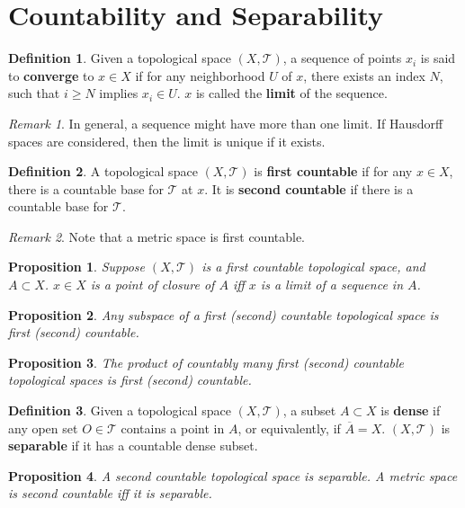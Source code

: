 \documentclass[openany]{book}
\newtheorem{proposition}{Proposition}[chapter]
\theoremstyle{definition}
\newtheorem{definition}{Definition}[chapter]
\theoremstyle{remark}
\newtheorem*{remark}{Remark}
\begin{document}
\section{Countability and Separability}
\begin{definition}
    Given a topological space $(X,\mathcal{T})$, a sequence of points $x_i$ is said to \textbf{converge} to $x\in X$ if for any neighborhood $U$ of $x$, there exists an index $N$, such that $i\ge N$ implies $x_i\in U$. $x$ is called the \textbf{limit} of the sequence.
\end{definition}
\begin{remark}
    In general, a sequence might have more than one limit. If Hausdorff spaces are considered, then the limit is unique if it exists.
\end{remark}
\begin{definition}
    A topological space $(X,\mathcal{T})$ is \textbf{first countable} if for any $x\in X$, there is a countable base for $\mathcal{T}$ at $x$. It is \textbf{second countable} if there is a countable base for $\mathcal{T}$.
\end{definition}
\begin{remark}
    Note that a metric space is first countable.
\end{remark}
\begin{proposition}
    Suppose $(X,\mathcal{T})$ is a first countable topological space, and $A\subset X$. $x\in X$ is a point of closure of $A$ iff $x$ is a limit of a sequence in $A$.
\end{proposition}
\begin{proposition}
    Any subspace of a first (second) countable topological space is first (second) countable.
\end{proposition}
\begin{proposition}
    The product of countably many first (second) countable topological spaces is first (second) countable.
\end{proposition}
\begin{definition}
    Given a topological space $(X,\mathcal{T})$, a subset $A\subset X$ is \textbf{dense} if any open set $O\in \mathcal{T}$ contains a point in $A$, or equivalently, if $\overline{A}=X$. $(X,\mathcal{T})$ is \textbf{separable} if it has a countable dense subset.
\end{definition}
\begin{proposition}
    A second countable topological space is separable. A metric space is second countable iff it is separable.
\end{proposition}
\end{document}
